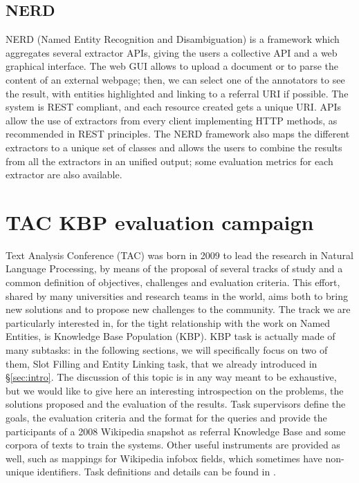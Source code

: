 \documentclass[a4paper,11pt]{report}
\begin{document}
\section{NERD}
NERD (Named Entity Recognition and Disambiguation) \cite{rizzo2012nerd} is a framework which aggregates several extractor APIs, giving the users a collective API and a web graphical interface.
The web GUI allows to upload a document or to parse the content of an external webpage; then, we can select one of the annotators to see the result, with entities highlighted and linking to a referral URI if possible. The system is REST compliant, and each resource created gets a unique URI. APIs allow the use of extractors from every client implementing HTTP methods, as recommended in REST principles.
The NERD framework also maps the different extractors to a unique set of classes and allows the users to combine the results from all the extractors in an unified output; some evaluation metrics for each extractor are also available.
\chapter{TAC KBP evaluation campaign}
\label{ch:tac}
Text Analysis Conference (TAC) was born in 2009 to lead the research in Natural Language Processing, by means of the proposal of several tracks of study and a common definition of objectives, challenges and evaluation criteria. This effort, shared by many universities and research teams in the world, aims both to bring new solutions and to propose new challenges to the community. The track we are particularly interested in, for the tight relationship with the work on Named Entities, is Knowledge Base Population (KBP).
KBP task is actually made of many subtasks: in the following sections, we will specifically focus on two of them, Slot Filling and Entity Linking task, that we already introduced in \S \ref{sec:intro}. The discussion of this topic is in any way meant to be exhaustive, but we would like to give here an interesting introspection on the problems, the solutions proposed and the evaluation of the results.
Task supervisors define the goals, the evaluation criteria and the format for the queries and provide the participants of a 2008 Wikipedia snapshot as referral Knowledge Base and some corpora of texts to train the systems. Other useful instruments are provided as well, such as mappings for Wikipedia infobox fields, which sometimes have non-unique identifiers.
Task definitions and details can be found in \cite{tac2009, tac2010, tac2011, tac2012}.
\end{document}
